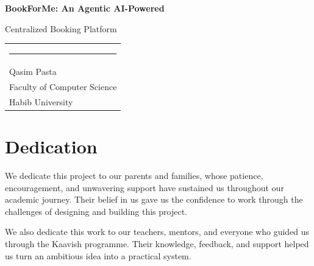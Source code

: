 \documentclass[12pt,a4paper,oneside]{report}
\begin{document}
\clearpage
\thispagestyle{empty}

\begingroup
\singlespacing
{}
\vspace*{0.2cm}
\begin{center}
  \begin{minipage}{0.94\textwidth}\centering
    {\LARGE\bfseries\linespread{1.08}\selectfont
      BookForMe: An Agentic AI-Powered\par
      Centralized Booking Platform\par}
  \end{minipage}
\end{center}

\vspace{6em}


\vspace{5.5em}

\begin{flushright}
  \begin{tabular}{@{}l@{}}
    \rule{9.5cm}{0.55pt} \\[1.15em]
    {\large Qasim Pasta} \\[0.45em]
    {\large Faculty of Computer Science} \\[0.45em]
    {\large Habib University}
  \end{tabular}
\end{flushright}

\vfill


\vspace{1.2cm}
\restoregeometry
\endgroup
\clearpage

\chapter*{Dedication}

We dedicate this project to our parents and families, whose patience,
encouragement, and unwavering support have sustained us throughout our academic
journey. Their belief in us gave us the confidence to work through the challenges
of designing and building this project.

We also dedicate this work to our teachers, mentors, and everyone who guided us
through the Kaavish programme. Their knowledge, feedback, and support helped us
turn an ambitious idea into a practical system.
\end{document}
